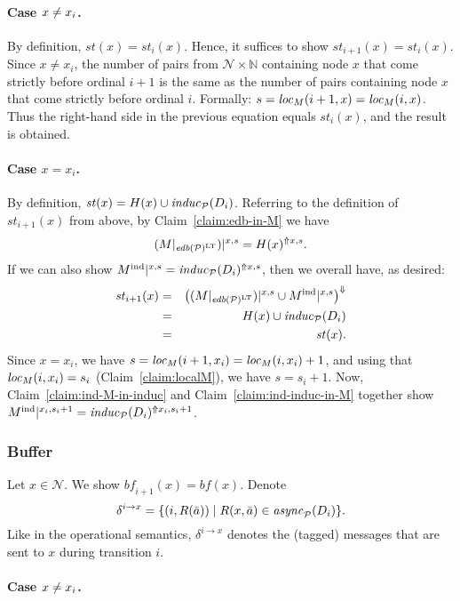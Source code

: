 \documentclass{tlp}
\newcommand{\Nat}{\mathbb{N}}  \newcommand{\len}[1]{|#1|} \newcommand{\rom}[1]{\text{\emph{(#1)}}} \newcommand{\romI}{\rom i}
\newcommand{\ded}{\mathcal{P}}
\newcommand{\proj}[2]{#1|_{#2}}
\newcommand{\edb}[1]{\fname{edb}(#1)}
\newcommand{\nw}{\mathcal{N}}
\newcommand{\sh}[1]{(#1)}
\newcommand{\toloct}[1]{#1^{\mathrm{LT}}}
\newcommand{\addlt}[3]{#1^{\Uparrow#2,#3}}
\newcommand{\projlt}[3]{#1|^{#2,#3}}
\newcommand{\shprojlt}[3]{\projlt{\sh{#1}}{#2}{#3}}
\newcommand{\droplt}[1]{#1^{\Downarrow}}
\newcommand{\cnfs}{\mathit{st}}
\newcommand{\cnfb}{\mathit{bf}}
\newcommand{\pair}[2]{(#1,#2)}
\newcommand{\sendto}[2]{\delta^{#1\to#2}}
\newcommand{\induc}[1]{\fname{induc}_{#1}}
\newcommand{\async}[1]{\fname{async}_{#1}}
\newcommand{\mstep}[1]{(#1)}
\newcommand{\nwnat}{\nw\times\Nat}
\newcommand{\locM}[1]{\fname{loc}_{M}(#1)}
\newcommand{\Mind}{M^{\mathrm{ind}}}
\begin{document}
\begin{appendix}
\paragraph{Case $x\protect\neq x_{i}$. }

By definition, $\cnfs(x)=\cnfs_{i}(x)$. Hence, it suffices to show
$\cnfs_{i+1}(x)=\cnfs_{i}(x)$. Since $x\neq x_{i}$, the number of
pairs from $\nwnat$ containing node $x$ that come strictly before
ordinal $i+1$ is the same as the number of pairs containing node
$x$ that come strictly before ordinal $i$. Formally: $s=\locM{i+1,x}=\locM{i,x}$.
Thus the right-hand side in the previous equation equals $\cnfs_{i}(x)$,
and the result is obtained.


\paragraph{Case $x=x_{i}$.}

By definition, $\cnfs(x)=H(x)\cup\induc{\ded}\mstep{D_{i}}$. Referring
to the definition of $\cnfs_{i+1}(x)$ from above, by Claim~\ref{claim:edb-in-M}
we have 
\[
\shprojlt{\proj M{\toloct{\edb{\ded}}}}xs=\addlt{H(x)}xs.
\]
If we can also show $\projlt{\Mind}xs=\addlt{\induc{\ded}\mstep{D_{i}}}xs$,
then we overall have, as desired: 
\begin{eqnarray*}
\cnfs_{i+1}(x) & = & \droplt{\left(\shprojlt{\proj M{\toloct{\edb{\ded}}}}xs\cup\projlt{\Mind}xs\right)}\\
 & = & H(x)\cup\induc{\ded}\mstep{D_{i}}\\
 & = & \cnfs(x).
\end{eqnarray*}
Since $x=x_{i}$, we have $s=\locM{i+1,x_{i}}=\locM{i,x_{i}}+1$,
and using that $\locM{i,x_{i}}=s_{i}$ (Claim~\ref{claim:localM}),
we have $s=s_{i}+1$. Now, Claim~\ref{claim:ind-M-in-induc} and
Claim~\ref{claim:ind-induc-in-M} together show $\projlt{\Mind}{x_{i}}{s_{i}+1}=\addlt{\induc{\ded}\mstep{D_{i}}}{x_{i}}{s_{i}+1}$.


\subsubsection{Buffer}

Let $x\in\nw$. We show $\cnfb_{i+1}(x)=\cnfb(x)$. Denote
\[
\sendto ix=\{\pair i{R(\bar{a})}\mid R(x,\bar{a})\in\async{\ded}\mstep{D_{i}}\}.
\]
Like in the operational semantics, $\sendto ix$ denotes the (tagged)
messages that are sent to $x$ during transition $i$.


\paragraph*{Case $x\protect\neq x_{i}$. }


\end{appendix}
\end{document}
